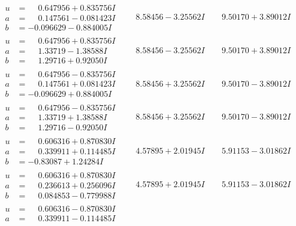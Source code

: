 \documentclass[1p]{elsarticle_modified}
\theoremstyle{definition}
\begin{document}
$$\begin{array}{c|c|c}
\begin{aligned}
u &= \phantom{-}0.647956 + 0.835756 I \\
a &= \phantom{-}0.147561 - 0.081423 I \\
b &= -0.096629 - 0.884005 I\end{aligned}
 & \phantom{-}8.58456 - 3.25562 I & \phantom{-}9.50170 + 3.89012 I \\ \hline\begin{aligned}
u &= \phantom{-}0.647956 + 0.835756 I \\
a &= \phantom{-}1.33719 - 1.38588 I \\
b &= \phantom{-}1.29716 + 0.92050 I\end{aligned}
 & \phantom{-}8.58456 - 3.25562 I & \phantom{-}9.50170 + 3.89012 I \\ \hline\begin{aligned}
u &= \phantom{-}0.647956 - 0.835756 I \\
a &= \phantom{-}0.147561 + 0.081423 I \\
b &= -0.096629 + 0.884005 I\end{aligned}
 & \phantom{-}8.58456 + 3.25562 I & \phantom{-}9.50170 - 3.89012 I \\ \hline\begin{aligned}
u &= \phantom{-}0.647956 - 0.835756 I \\
a &= \phantom{-}1.33719 + 1.38588 I \\
b &= \phantom{-}1.29716 - 0.92050 I\end{aligned}
 & \phantom{-}8.58456 + 3.25562 I & \phantom{-}9.50170 - 3.89012 I \\ \hline\begin{aligned}
u &= \phantom{-}0.606316 + 0.870830 I \\
a &= \phantom{-}0.339911 + 0.114485 I \\
b &= -0.83087 + 1.24284 I\end{aligned}
 & \phantom{-}4.57895 + 2.01945 I & \phantom{-}5.91153 - 3.01862 I \\ \hline\begin{aligned}
u &= \phantom{-}0.606316 + 0.870830 I \\
a &= \phantom{-}0.236613 + 0.256096 I \\
b &= \phantom{-}0.084853 - 0.779988 I\end{aligned}
 & \phantom{-}4.57895 + 2.01945 I & \phantom{-}5.91153 - 3.01862 I \\ \hline\begin{aligned}
u &= \phantom{-}0.606316 - 0.870830 I \\
a &= \phantom{-}0.339911 - 0.114485 I \\

\end{aligned}
\end{array}$$
\end{document}
